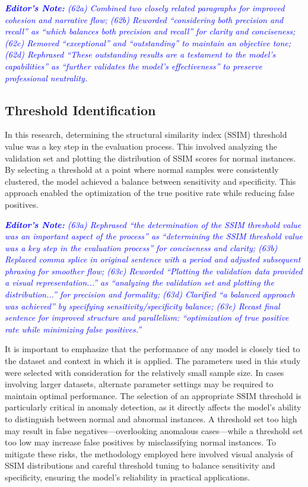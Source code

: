 \documentclass[journal,12pt,onecolumn,draftcls]{IEEEtran}
\newcommand{\editornote}[1]{\par\textit{\textcolor{blue}{\textbf{Editor's Note:} #1}}\par}
\begin{document}
\editornote{
(62a) Combined two closely related paragraphs for improved cohesion and narrative flow;
(62b) Reworded “considering both precision and recall” as “which balances both precision and recall” for clarity and conciseness;
(62c) Removed “exceptional” and “outstanding” to maintain an objective tone;
(62d) Rephrased “These outstanding results are a testament to the model’s capabilities” as “further validates the model’s effectiveness” to preserve professional neutrality.
}

\subsection{Threshold Identification}
In this research, determining the structural similarity index (SSIM) threshold value was a key step in the evaluation process. This involved analyzing the validation set and plotting the distribution of SSIM scores for normal instances. By selecting a threshold at a point where normal samples were consistently clustered, the model achieved a balance between sensitivity and specificity. This approach enabled the optimization of the true positive rate while reducing false positives.

\editornote{(63a) Rephrased “the determination of the SSIM threshold value was an important aspect of the process” as “determining the SSIM threshold value was a key step in the evaluation process” for conciseness and clarity;
(63b) Replaced comma splice in original sentence with a period and adjusted subsequent phrasing for smoother flow;
(63c) Reworded “Plotting the validation data provided a visual representation...” as “analyzing the validation set and plotting the distribution...” for precision and formality;
(63d) Clarified “a balanced approach was achieved” by specifying sensitivity/specificity balance;
(63e) Recast final sentence for improved structure and parallelism: “optimization of true positive rate while minimizing false positives.”}

It is important to emphasize that the performance of any model is closely tied to the dataset and context in which it is applied. The parameters used in this study were selected with consideration for the relatively small sample size. In cases involving larger datasets, alternate parameter settings may be required to maintain optimal performance. The selection of an appropriate SSIM threshold is particularly critical in anomaly detection, as it directly affects the model’s ability to distinguish between normal and abnormal instances. A threshold set too high may result in false negatives—overlooking anomalous cases—while a threshold set too low may increase false positives by misclassifying normal instances. To mitigate these risks, the methodology employed here involved visual analysis of SSIM distributions and careful threshold tuning to balance sensitivity and specificity, ensuring the model’s reliability in practical applications.
\end{document}
